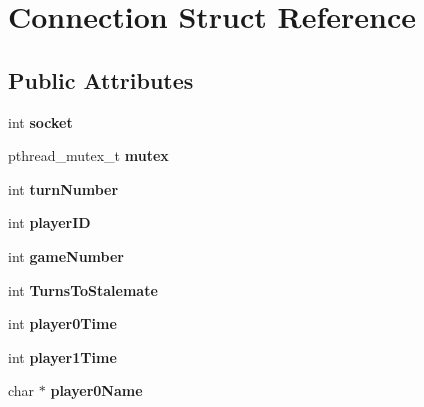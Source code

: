 \hypertarget{structConnection}{
\section{Connection Struct Reference}
\label{structConnection}
}
\subsection*{Public Attributes}
\begin{DoxyCompactItemize}
\item 
\hypertarget{structConnection_afeebe9a1ebc19966d58faa5eca7ad36d}{
int {\bfseries socket}}
\label{structConnection_afeebe9a1ebc19966d58faa5eca7ad36d}

\item 
\hypertarget{structConnection_a7b27ff790f8a42a54c76ef4d163d7e57}{
pthread\_\-mutex\_\-t {\bfseries mutex}}
\label{structConnection_a7b27ff790f8a42a54c76ef4d163d7e57}

\item 
\hypertarget{structConnection_ae1f13fe61a2400a6a1cc9322f25d286b}{
int {\bfseries turnNumber}}
\label{structConnection_ae1f13fe61a2400a6a1cc9322f25d286b}

\item 
\hypertarget{structConnection_a8054101484b1635e9e2888390fc7e82d}{
int {\bfseries playerID}}
\label{structConnection_a8054101484b1635e9e2888390fc7e82d}

\item 
\hypertarget{structConnection_a33a204e9624fbd7b0a77347a15ec0f10}{
int {\bfseries gameNumber}}
\label{structConnection_a33a204e9624fbd7b0a77347a15ec0f10}

\item 
\hypertarget{structConnection_a2b82d435ebc8aafa5ba689cb2b61da29}{
int {\bfseries TurnsToStalemate}}
\label{structConnection_a2b82d435ebc8aafa5ba689cb2b61da29}

\item 
\hypertarget{structConnection_a214b3530af5b40ec1abd7b6817770a3e}{
int {\bfseries player0Time}}
\label{structConnection_a214b3530af5b40ec1abd7b6817770a3e}

\item 
\hypertarget{structConnection_a0adf2a815f73e16206d911f63caededa}{
int {\bfseries player1Time}}
\label{structConnection_a0adf2a815f73e16206d911f63caededa}

\item 
\hypertarget{structConnection_a6199df3cf201346b6e1d664791bad969}{
char $\ast$ {\bfseries player0Name}}
\label{structConnection_a6199df3cf201346b6e1d664791bad969}


\end{DoxyCompactItemize}
